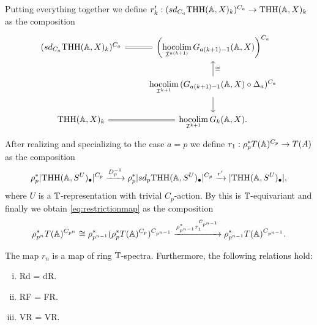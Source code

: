 Putting everything together we define $r'_k:(sd_{C_a} \mathrm{THH}(\mathbb{A}, X)_k)^{C_a}\to
\mathrm{THH}(\mathbb{A}, X)_k$ as the composition
\begin{equation}
\begin{tikzcd}
(sd_{C_a} \mathrm{THH}(\A, X)_k)^{C_a} \arrow[equal]{r}
&\left(\underset{\mathcal{I}^{a(k+1)}}{\hocolim}\, G_{a(k+1)-1}(\A,X) \right)^{C_a}\\
& \underset{\mathcal{I}^{k+1}}{\hocolim}\, (G_{a(k+1) - 1}(\A,X)\circ \Delta_a)^{C_a}
\arrow[swap]{u}{\cong}
\arrow{d}\\
 \mathrm{THH}(\A,X)_k\arrow[equal]{r}
& \underset{\mathcal{I}^{k+1}}{\hocolim}\, G_{k}(\A, X).
\end{tikzcd}
\end{equation}
After realizing and specializing to the case $a = p$
we define $r_1:\rho_p^\ast T(\mathbb{A})^{C_p}\to T(A)$
as the composition
\begin{align}\label{eq:thhrestriction}
\rho_p^\ast |\mathrm{THH}(\mathbb{A}, S^U)_\bullet|^{C_p}\xrightarrow{D_p^{-1}} 
\rho_p^\ast |sd_p\mathrm{THH}(\mathbb{A},S^U)_\bullet|^{C_p}\xrightarrow{r'}
|\mathrm{THH}(\mathbb{A}, S^U)_\bullet|,
\end{align}
where $U$ is a $\mathbb{T}$-representation with trivial $C_p$-action.
By \cite[Lemma~1.10, \pno~470]{bhmcyclotomic} this is $\mathbb{T}$-equivariant
and finally we obtain \eqref{eq:restrictionmap} as the composition
\[
\rho_{p^n}^\ast T(\mathbb{A})^{C_{p^n}}\cong \rho_{p^{n-1}}^\ast(\rho_p^\ast T(\mathbb{A})^{C_p})^{C_{p^{n-1}}}
\xrightarrow{\rho_{p^{n-1}}^\ast r_1^{C_{p^{n-1}}}} 
\rho_{p^{n-1}}^\ast T(\mathbb{A})^{C_{p^{n-1}}}.
\]
\begin{lem}\label{lem:restrictionrelations}
The map $r_n$ is a map of ring $\mathbb{T}$-spectra.
Furthermore, the following relations hold:
\begin{enumerate}[(i)]
\item Rd = dR.
\item RF = FR.
\item VR = VR.
\end{enumerate}
\end{lem}

